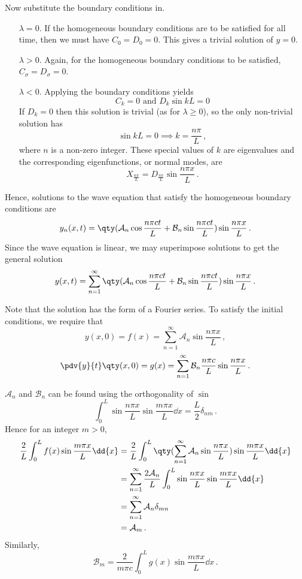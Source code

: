 \documentclass{article}
\theoremstyle{plain}\theoremheaderfont{\normalfont\itshape}\theorembodyfont{\rmfamily}\theoremseparator{.}\newtheorem*{rem}{Remark}\newtheorem*{ex}{Example}\newtheorem*{proof}{Proof}\newtheorem*{altp}{Alternative proof}
\theoremstyle{plain}\theoremheaderfont{\normalfont\bfseries}\theorembodyfont{\rmfamily}\theoremseparator{.}\newtheorem{thm}{Theorem}[section]\newtheorem{lem}[thm]{Lemma}\newtheorem{prop}[thm]{Proposition}\newtheorem*{cor}{Corollary}\newtheorem{defn}[thm]{Definition}\newtheorem{clm}[thm]{Claim}\newtheorem{clminproof}{Claim}
\theoremstyle{break}\theoremheaderfont{\normalfont\itshape}\theorembodyfont{\rmfamily}\theoremseparator{.\medskip}\newtheorem*{proofskip}{Proof}\newtheorem*{exs}{Examples}\newtheorem*{rems}{Remarks}
\theoremstyle{break}\theoremheaderfont{\normalfont\bfseries}\theorembodyfont{\rmfamily}\theoremseparator{.\medskip}\newtheorem{lemskip}[thm]{Lemma}\newtheorem{defnskip}[thm]{Definition}\newtheorem{propskip}[thm]{Proposition}\newtheorem{thmskip}[thm]{Theorem}
\numberwithin{equation}{section}
\begin{document}
	Now substitute the boundary conditions in.
	\begin{itemize}[leftmargin=32pt]
		\item[\(\lambda=0\).] If the homogeneous boundary conditions are to be satisfied for all time, then we must have \(C_0=D_0=0\). This gives a trivial solution of \(y=0\).
		\item[\(\lambda>0\).] Again, for the homogeneous boundary conditions to be satisfied, \(C_\sigma=D_\sigma=0\).
		\item[\(\lambda<0\).] Applying the boundary conditions yields
		\[C_k=0\text{ and }D_k\sin kL=0\]
		If \(D_k=0\) then this solution is trivial (as for \(\lambda\ge 0\)), so the only non-trivial solution has
		\[\sin kL=0\implies k=\frac{n\pi}{L}\,,\]
		where \(n\) is a non-zero integer. These special values of \(k\) are eigenvalues and the corresponding eigenfunctions, or normal modes, are
		\[X_{\frac{n\pi}{L}}=D_{\frac{n\pi}{L}} \sin\frac{n\pi x}{L}\,.\]
	\end{itemize}
	
	Hence, solutions to the wave equation that satisfy the homogeneous boundary conditions are
	\[y_n(x,t)=\qty(\mathcal{A}_n\cos\frac{n\pi ct}{L}+\mathcal{B}_n\sin\frac{n\pi ct}{L})\sin\frac{n\pi x}{L}\,.\]
	Since the wave equation is linear, we may superimpose solutions to get the general solution
	\[y(x,t)=\sum_{n=1}^{\infty}\qty(\mathcal{A}_n\cos\frac{n\pi ct}{L}+\mathcal{B}_n\sin\frac{n\pi ct}{L})\sin\frac{n\pi x}{L}\,.\]
	
	Note that the solution has the form of a Fourier series. To satisfy the initial conditions, we require that
	\[y(x,0)=f(x)=\sum_{n=1}^{\infty}\mathcal{A}_n\sin\frac{n\pi x}{L}\,,\]
	\[\pdv{y}{t} \qty(x,0)=g(x)=\sum_{n=1}^{\infty}\mathcal{B}_n\frac{n\pi c}{L}\sin\frac{n\pi x}{L}\,.\]
	
	\(\mathcal{A}_n\) and \(\mathcal{B}_n\) can be found using the orthogonality of \(\sin\)
	\[\int_{0}^{L}\sin\frac{n\pi x}{L}\sin\frac{m\pi x}{L}\dd{x}=\frac{L}{2}\delta_{nm}\,.\]
	Hence for an integer \(m>0\),
	\begin{align*}
		\frac{2}{L}\int_{0}^{L}f(x)\sin\frac{m\pi x}{L}\dd{x}&=\frac{2}{L}\int_{0}^{L}\qty(\sum_{n=1}^{\infty}\mathcal{A}_n\sin\frac{n\pi x}{L})\sin\frac{m\pi x}{L}\dd{x}\\
		&=\sum_{n=1}^{\infty}\frac{2\mathcal{A}_n}{L}\int_{0}^{L}\sin\frac{n\pi x}{L}\sin\frac{m\pi x}{L}\dd{x}\\
		&=\sum_{n=1}^{\infty}\mathcal{A}_n\delta_{mn}\\
		&=\mathcal{A}_m\,.
	\end{align*}
	Similarly,
	\[\mathcal{B}_m=\frac{2}{m\pi c}\int_{0}^{L}g(x)\sin\frac{m\pi x}{L}\dd{x}\,.\]
\end{document}
